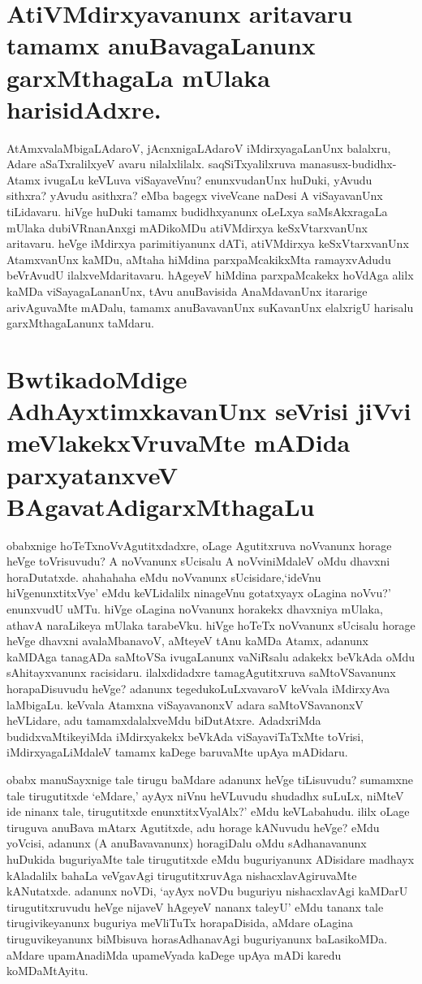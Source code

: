 \section*{AtiVMdirxyavanunx aritavaru tamamx anuBavagaLanunx garxMthagaLa mUlaka harisidAdxre.}

AtAmxvalaMbigaLAdaroV, jAcnxnigaLAdaroV iMdirxyagaLanUnx balalxru, Adare aSaTxralilxyeV avaru nilalxlilalx. saqSiTxyalilxruva manasusx-budidhx-Atamx ivugaLu keVLuva viSayaveVnu? enunxvudanUnx huDuki, yAvudu sithxra? yAvudu asithxra? eMba bagegx viveVcane naDesi A viSayavanUnx tiLidavaru. hiVge huDuki tamamx budidhxyanunx oLeLxya saMsAkxragaLa mUlaka dubiVRnanAnxgi mADikoMDu atiVMdirxya keSxVtarxvanUnx aritavaru. heVge iMdirxya parimitiyanunx dATi, atiVMdirxya keSxVtarxvanUnx AtamxvanUnx kaMDu, aMtaha hiMdina parxpaMcakikxMta ramayxvAdudu beVrAvudU ilalxveMdaritavaru. hAgeyeV hiMdina parxpaMcakekx hoVdAga alilx kaMDa viSayagaLananUnx, tAvu anuBavisida AnaMdavanUnx itararige arivAguvaMte mADalu, tamamx anuBavavanUnx suKavanUnx elalxrigU harisalu garxMthagaLanunx taMdaru.

\section*{BwtikadoMdige AdhAyxtimxkavanUnx seVrisi jiVvi meVlakekxVruvaMte mADida parxyatanxveV BAgavatAdigarxMthagaLu}

obabxnige hoTeTxnoVvAgutitxdadxre, oLage Agutitxruva noVvanunx horage heVge toVrisuvudu? A noVvanunx sUcisalu A noVviniMdaleV oMdu dhavxni horaDutatxde. ahahahaha eMdu noVvanunx sUcisidare,`ideVnu hiVgenunxtitxVye' eMdu keVLidalilx ninageVnu gotatxyayx oLagina noVvu?' enunxvudU uMTu. hiVge oLagina noVvanunx horakekx dhavxniya mUlaka, athavA naraLikeya mUlaka tarabeVku. hiVge hoTeTx noVvanunx sUcisalu horage heVge dhavxni avalaMbanavoV, aMteyeV tAnu kaMDa Atamx, adanunx kaMDAga tanagADa saMtoVSa ivugaLanunx vaNiRsalu adakekx beVkAda oMdu sAhitayxvanunx racisidaru. ilalxdidadxre tamagAgutitxruva saMtoVSavanunx horapaDisuvudu heVge? adanunx tegedukoLuLxvavaroV keVvala iMdirxyAva laMbigaLu. keVvala Atamxna viSayavanonxV adara saMtoVSavanonxV heVLidare, adu tamamxdalalxveMdu biDutAtxre. AdadxriMda budidxvaMtikeyiMda iMdirxyakekx beVkAda viSayaviTaTxMte toVrisi, iMdirxyagaLiMdaleV tamamx kaDege baruvaMte upAya mADidaru.

obabx manuSayxnige tale tirugu baMdare adanunx heVge tiLisuvudu? sumamxne tale tirugutitxde  `eMdare,' ayAyx niVnu heVLuvudu shudadhx suLuLx, niMteV ide ninanx tale, tirugutitxde enunxtitxVyalAlx?' eMdu keVLabahudu. ililx oLage tiruguva anuBava mAtarx Agutitxde, adu horage kANuvudu heVge? eMdu yoVcisi, adanunx (A anuBavavanunx) horagiDalu oMdu sAdhanavanunx huDukida buguriyaMte tale tirugutitxde eMdu buguriyanunx ADisidare madhayx kAladalilx bahaLa veVgavAgi tirugutitxruvAga nishacxlavAgiruvaMte kANutatxde. adanunx noVDi, `ayAyx noVDu buguriyu nishacxlavAgi kaMDarU tirugutitxruvudu heVge nijaveV hAgeyeV nananx taleyU' eMdu tananx tale tirugivikeyanunx buguriya meVliTuTx horapaDisida, aMdare oLagina tiruguvikeyanunx biMbisuva horasAdhanavAgi buguriyanunx baLasikoMDa. aMdare upamAnadiMda upameVyada kaDege upAya mADi karedu koMDaMtAyitu. 

